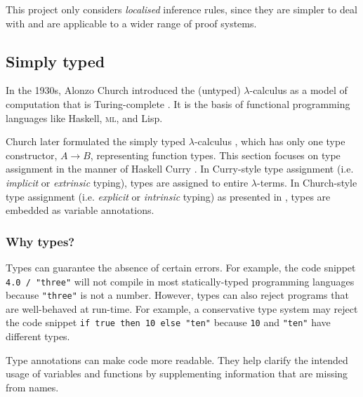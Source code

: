 This project only considers \textit{localised} inference rules, since they are simpler to deal with and are applicable to a wider range of proof systems.

\subsection{Simply typed \lc{}}
In the 1930s, Alonzo Church introduced the (untyped) $\lambda$-calculus \cite{church:1936} as a model of computation that is Turing-complete \cite{turing:1937}. It is the basis of functional programming languages like Haskell, \textsc{ml}, and Lisp.

Church later formulated the simply typed $\lambda$-calculus \cite{church:1940}, which has only one type constructor, $A \to B$, representing function types. This section focuses on type assignment in the manner of Haskell Curry \cite{curry:1934}. In Curry-style type assignment (i.e. \textit{implicit} or \textit{extrinsic} typing), types are assigned to entire $\lambda$-terms. In Church-style type assignment (i.e. \textit{explicit} or \textit{intrinsic} typing) as presented in \cite{church:1940}, types are embedded as variable annotations.

\subsubsection{Why types?}
Types can guarantee the absence of certain errors. For example, the code snippet \lstinline{4.0 / "three"} will not compile in most statically-typed programming languages because \lstinline{"three"} is not a number. However, types can also reject programs that are well-behaved at run-time. For example, a conservative type system may reject the code snippet \lstinline{if true then 10 else "ten"} because \lstinline{10} and \lstinline{"ten"} have different types.

Type annotations can make code more readable. They help clarify the intended usage of variables and functions by supplementing information that are missing from names.

